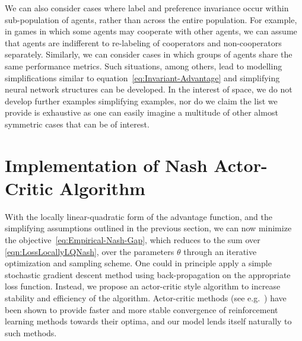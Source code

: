 \documentclass[onefignum,onetabnum]{siamonline171218}
\begin{document}
\begin{remark}
We can also consider cases where label and preference invariance   occur within sub-population of agents, rather than across the entire population. For example, in games in which some agents may cooperate with other agents, we can assume that agents are indifferent to re-labeling of cooperators and non-cooperators separately. Similarly, we can consider cases in which groups of agents share the same performance metrics. Such situations, among others, lead to modelling simplifications similar to equation~\eqref{eq:Invariant-Advantage} and simplifying neural network structures can be developed. In the interest of space, we do not develop further examples simplifying examples, nor do we claim the list we provide is exhaustive as one can easily imagine a multitude of other almost symmetric cases that can be of interest.
\end{remark}

\section{Implementation of Nash Actor-Critic Algorithm}
\label{sec:Implementation-Details-Section}
With the locally linear-quadratic form of the advantage function, and the simplifying assumptions outlined in the previous section, we can now minimize the objective~\eqref{eq:Empirical-Nash-Gap}, which reduces to the sum over \eqref{eqn:LossLocallyLQNash}, over the parameters $\theta$ through an iterative optimization and sampling scheme. One could in principle apply a simple stochastic gradient descent method using back-propagation on the appropriate loss function. Instead, we propose an actor-critic style algorithm to increase stability and efficiency of the algorithm. Actor-critic methods (see e.g.~\cite{konda2000actor}) have been shown to provide faster and more stable convergence of reinforcement learning methods towards their optima, and our model lends itself naturally to  such methods.
\end{document}
